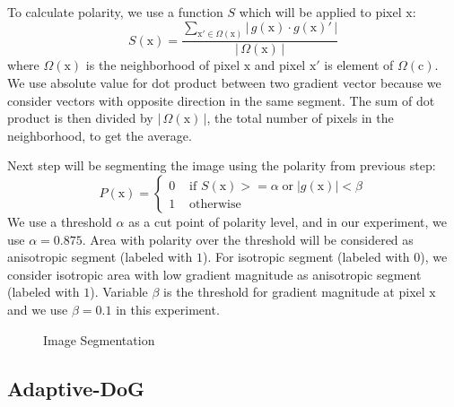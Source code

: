To calculate polarity, we use a function $S$ which will be applied to pixel $\mbox{x}$:
\begin{equation}
	S(\mbox{x})=\frac{\sum\limits_{\mathrm{x}' \in \Omega (\mathrm{x})}\left|\,g(\mbox{x}) \cdot g(\mbox{x})'\,|\right.}
		{\left|\,\Omega(\mathrm{x})\,|\right.}
\end{equation}
where $\Omega(\mbox{x})$ is the neighborhood of pixel $\mbox{x}$ and pixel $\mbox{x}'$ is element of $\Omega(\mbox{c})$. We use absolute value for dot product between two gradient vector because we consider vectors with opposite direction in the same segment. The sum of dot product is then divided by ${\left|\,\Omega(\mathrm{x})\,|\right.}$, the total number of pixels in the neighborhood, to get the average.

Next step will be segmenting the image using the polarity from previous step:
\begin{equation}
	P(\mbox{x})=
		\left\{
			\begin{array}{ll}
				0&\mbox{ if }S(\mbox{x}) >= \alpha \;\mbox{or}\; \left|g(\mbox{x})|\right. < \beta
				\\
				1&\mbox{ otherwise }
			\end{array}
		\right.
\end{equation}
We use a threshold $\alpha$ as a cut point of polarity level, and in our experiment, we use $\alpha = 0.875$. Area with polarity over the threshold will be considered as anisotropic segment (labeled with $1$). For isotropic segment (labeled with $0$), we consider isotropic area with low gradient magnitude as anisotropic segment (labeled with $1$). Variable $\beta$ is the threshold for gradient magnitude at pixel $\mbox{x}$ and we use $\beta = 0.1$ in this experiment. 
\begin{figure}[H]
	\centering
	\caption{Image Segmentation}
\end{figure}

\subsection{Adaptive-DoG}

